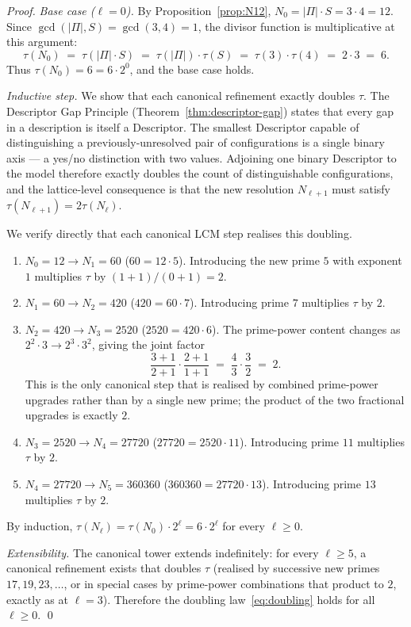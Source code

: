 \documentclass[11pt,a4paper]{article}
\theoremstyle{definition}
\theoremstyle{remark}
\begin{document}
\begin{proof}
\emph{Base case ($\ell=0$).} By Proposition~\ref{prop:N12}, $N_{0} = |\Pi|\cdot S = 3\cdot 4 = 12$. Since $\gcd(|\Pi|, S) = \gcd(3,4) = 1$, the divisor function is multiplicative at this argument:
\[
\tau(N_{0}) \;=\; \tau(|\Pi|\cdot S) \;=\; \tau(|\Pi|)\cdot \tau(S) \;=\; \tau(3)\cdot \tau(4) \;=\; 2\cdot 3 \;=\; 6.
\]
Thus $\tau(N_{0}) = 6 = 6\cdot 2^{0}$, and the base case holds.

\emph{Inductive step.} We show that each canonical refinement exactly doubles $\tau$. The Descriptor Gap Principle (Theorem~\ref{thm:descriptor-gap}) states that every gap in a description is itself a Descriptor. The smallest Descriptor capable of distinguishing a previously-unresolved pair of configurations is a single binary axis --- a yes/no distinction with two values. Adjoining one binary Descriptor to the model therefore exactly doubles the count of distinguishable configurations, and the lattice-level consequence is that the new resolution $N_{\ell+1}$ must satisfy $\tau(N_{\ell+1}) = 2\tau(N_{\ell})$.

We verify directly that each canonical LCM step realises this doubling.
\begin{enumerate}[leftmargin=*]
\item \emph{$N_{0}=12 \to N_{1}=60$} ($60 = 12\cdot 5$). Introducing the new prime $5$ with exponent $1$ multiplies $\tau$ by $(1+1)/(0+1) = 2$.
\item \emph{$N_{1}=60 \to N_{2}=420$} ($420 = 60\cdot 7$). Introducing prime $7$ multiplies $\tau$ by $2$.
\item \emph{$N_{2}=420 \to N_{3}=2520$} ($2520 = 420 \cdot 6$). The prime-power content changes as $2^{2}\cdot 3 \to 2^{3}\cdot 3^{2}$, giving the joint factor
\[
\frac{3+1}{2+1}\cdot\frac{2+1}{1+1} \;=\; \frac{4}{3}\cdot\frac{3}{2} \;=\; 2.
\]
This is the only canonical step that is realised by combined prime-power upgrades rather than by a single new prime; the product of the two fractional upgrades is exactly $2$.
\item \emph{$N_{3}=2520 \to N_{4}=27720$} ($27720 = 2520\cdot 11$). Introducing prime $11$ multiplies $\tau$ by $2$.
\item \emph{$N_{4}=27720 \to N_{5}=360360$} ($360360 = 27720\cdot 13$). Introducing prime $13$ multiplies $\tau$ by $2$.
\end{enumerate}
By induction, $\tau(N_{\ell}) = \tau(N_{0})\cdot 2^{\ell} = 6\cdot 2^{\ell}$ for every $\ell\ge 0$.

\emph{Extensibility.} The canonical tower extends indefinitely: for every $\ell\ge 5$, a canonical refinement exists that doubles $\tau$ (realised by successive new primes $17,19,23,\ldots$, or in special cases by prime-power combinations that product to $2$, exactly as at $\ell=3$). Therefore the doubling law~\eqref{eq:doubling} holds for all $\ell\ge 0$. \qed
\end{proof}
\end{document}
